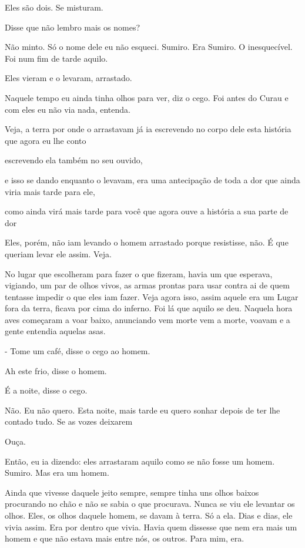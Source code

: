 Eles são dois. Se misturam.

Disse que não lembro mais os nomes?

Não minto. Só o nome dele eu não esqueci. Sumiro. Era Sumiro. O
inesquecível.\\

Foi num fim de tarde aquilo.

Eles vieram e o levaram, arrastado.

Naquele tempo eu ainda tinha olhos para ver, diz o cego. Foi antes do
Curau e com eles eu não via nada, entenda.

Veja, a terra por onde o arrastavam já ia escrevendo no corpo dele esta
história que agora eu lhe conto

escrevendo ela também no seu ouvido,

e isso se dando enquanto o levavam, era uma antecipação de toda a dor
que ainda viria mais tarde para ele,

como ainda virá mais tarde para você que agora ouve a história a sua
parte de dor

Eles, porém, não iam levando o homem arrastado porque resistisse, não. É
que queriam levar ele assim. Veja.

No lugar que escolheram para fazer o que fizeram, havia um que esperava,
vigiando, um par de olhos vivos, as armas prontas para usar contra ai de
quem tentasse impedir o que eles iam fazer. Veja agora isso, assim
aquele era um Lugar fora da terra, ficava por cima do inferno. Foi lá
que aquilo se deu. Naquela hora aves começaram a voar baixo, anunciando
vem morte vem a morte, voavam e a gente entendia aquelas asas.

- Tome um café, disse o cego ao homem.

Ah este frio, disse o homem.

É a noite, disse o cego.

Não. Eu não quero. Esta noite, mais tarde eu quero sonhar depois de ter
lhe contado tudo. Se as vozes deixarem

Ouça.

Então, eu ia dizendo: eles arrastaram aquilo como se não fosse um homem.
Sumiro. Mas era um homem.

Ainda que vivesse daquele jeito sempre, sempre tinha uns olhos baixos
procurando no chão e não se sabia o que procurava. Nunca se viu ele
levantar os olhos. Eles, os olhos daquele homem, se davam à terra. Só a
ela. Dias e dias, ele vivia assim. Era por dentro que vivia. Havia quem
dissesse que nem era mais um homem e que não estava mais entre nós, os
outros. Para mim, era.


